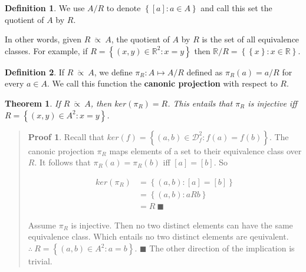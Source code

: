 \documentclass[a4paper, 12pt]{article}
\newtheorem{theorem}{Theorem}
\theoremstyle{definition}
\theoremstyle{definition}
\theoremstyle{definition}
\newtheorem{definition}{Definition}
\newtheorem{pro}{Proof}
\begin{document}
\begin{definition}
    We use $A / R$ to denote $\left\{ [a] : a \in A \right\} $ and call this set
    the quotient of $A$ by $R$.
\end{definition}

In other words, given $R ~ \ddot{\propto} ~A$, the quotient of $A$ by $R$ is the
set of all equivalence classes. For example, if $R = \left\{ (x, y) \in
\mathbb{R}^2 : x = y \right\} $ then $\mathbb{R} / R = \left\{ \left\{ x \right\}  : x \in
\mathbb{R} \right\} $. 

\begin{definition}
    If $R ~ \ddot{\propto} ~A$, we define $\pi_R : A \mapsto A / R$ defined as
    $\pi_R(a) = a /R$ for every $a \in A$. We call this function the
    \textbf{canonic projection} with respect to $R$.
\end{definition}

\begin{theorem}
    If $R ~ \ddot{\propto} ~A$, then $ker(\pi_R) = R$. This entails that $\pi_R$
    is injective iff $R = \left\{ (x, y) \in A^2 : x = y \right\} $.
\end{theorem}


\small
\begin{quote}

\begin{pro}
Recall that $ker(f) = \left\{ (a, b) \in \mathcal{D}_f^2 : f(a)
= f(b) \right\} $. The canonic projection $\pi_R$ maps elements of a set to
their equivalence class over $R$. It follows that $\pi_R(a) = \pi_R(b)$ iff
$[a] = [b]$. So 

\begin{align*}
    ker(\pi_R) &= \left\{ (a, b) : [a] = [b] \right\} \\ 
               &=\left\{ (a, b) : aRb \right\} \\ 
               &= R ~ \blacksquare
\end{align*}

Assume $\pi_R$ is injective. Then no two distinct elements can have the same
equivalence class. Which entails no two distinct elements are qeuivalent.
$\therefore ~ R = \left\{ (a, b) \in A^2 : a = b \right\} $. $\blacksquare$ The
other direction of the implication is trivial.

\end{pro}


\end{quote}
\normalsize
\end{document}
